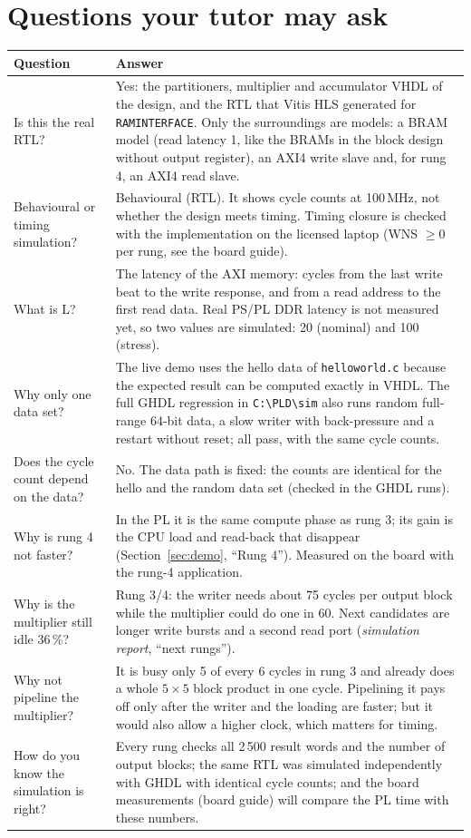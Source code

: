 \documentclass[11pt,a4paper]{article}
\newcommand{\code}[1]{\texttt{#1}}
\newcommand{\bs}{\textbackslash\allowbreak{}}
\renewcommand{\_}{\oldunderscore\allowbreak{}}
\newcommand{\pld}[1]{\code{C:\bs PLD\bs #1}}
\begin{document}
\section{Questions your tutor may ask}
\begin{longtable}{@{}p{5.2cm}p{9.8cm}@{}}
\toprule
\textbf{Question} & \textbf{Answer} \\
\midrule
\endhead
Is this the real RTL? & Yes: the partitioners, multiplier and accumulator VHDL of the design, and the RTL that Vitis HLS generated for \code{RAM\_INTERFACE}. Only the surroundings are models: a BRAM model (read latency 1, like the BRAMs in the block design without output register), an AXI4 write slave and, for rung 4, an AXI4 read slave. \\
Behavioural or timing simulation? & Behavioural (RTL). It shows cycle counts at 100\,MHz, not whether the design meets timing. Timing closure is checked with the implementation on the licensed laptop (WNS $\geq 0$ per rung, see the board guide). \\
What is L? & The latency of the AXI memory: cycles from the last write beat to the write response, and from a read address to the first read data. Real PS/PL DDR latency is not measured yet, so two values are simulated: 20 (nominal) and 100 (stress). \\
Why only one data set? & The live demo uses the hello data of \code{helloworld.c} because the expected result can be computed exactly in VHDL. The full GHDL regression in \pld{sim} also runs random full-range 64-bit data, a slow writer with back-pressure and a restart without reset; all pass, with the same cycle counts. \\
Does the cycle count depend on the data? & No. The data path is fixed: the counts are identical for the hello and the random data set (checked in the GHDL runs). \\
Why is rung 4 not faster? & In the PL it is the same compute phase as rung 3; its gain is the CPU load and read-back that disappear (Section~\ref{sec:demo}, ``Rung 4''). Measured on the board with the rung-4 application. \\
Why is the multiplier still idle 36\,\%? & Rung 3/4: the writer needs about 75 cycles per output block while the multiplier could do one in 60. Next candidates are longer write bursts and a second read port (\emph{simulation report}, ``next rungs''). \\
Why not pipeline the multiplier? & It is busy only 5 of every 6 cycles in rung 3 and already does a whole $5\times5$ block product in one cycle. Pipelining it pays off only after the writer and the loading are faster; but it would also allow a higher clock, which matters for timing. \\
How do you know the simulation is right? & Every rung checks all 2\,500 result words and the number of output blocks; the same RTL was simulated independently with GHDL with identical cycle counts; and the board measurements (board guide) will compare the PL time with these numbers. \\
\bottomrule
\end{longtable}
\end{document}
